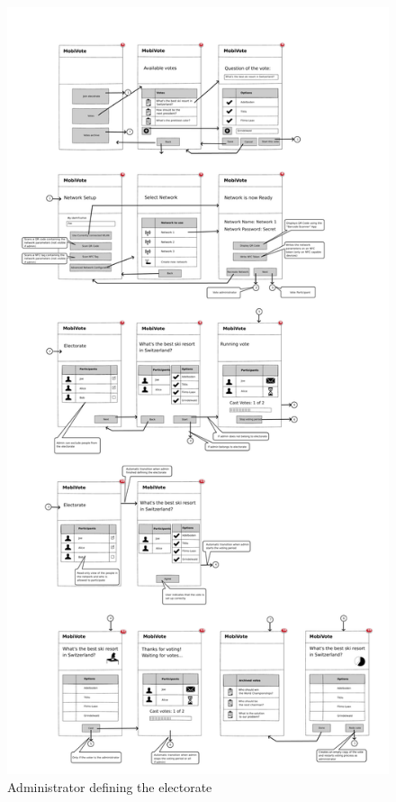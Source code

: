 \documentclass[numbers=noenddot, abstract=on, a4paper, headsepline,
footsepline, oneside, draft=off]{scrreprt}
\begin{document}
\begin{figure}[htbp]
	\centering
	\includegraphics[height=.4\textheight]{img/admin_review}
	\caption{Administrator defining the electorate}
	\label{fig:admin_review}
\end{figure}
\end{document}
